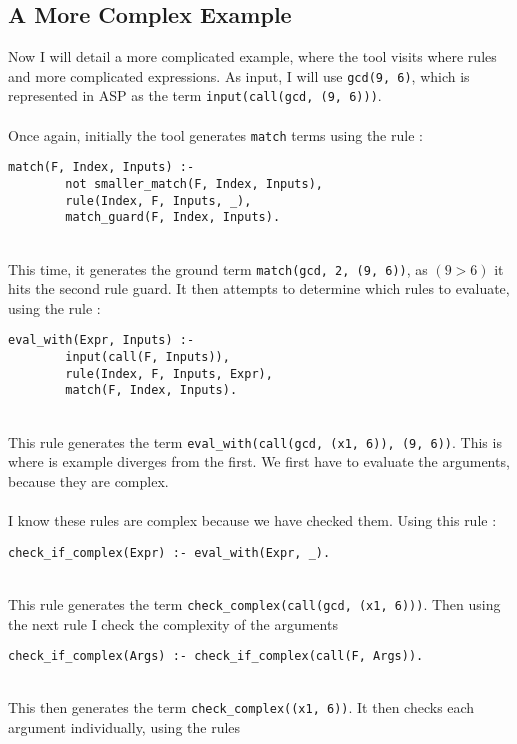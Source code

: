 \subsection{A More Complex Example}
Now I will detail a more complicated example, where the tool visits where rules and more complicated expressions. As input, I will use \lstinline{gcd(9, 6)}, which is represented in ASP as the term \lstinline{input(call(gcd, (9, 6)))}. \\ \\
Once again, initially the tool generates \lstinline{match} terms using the rule : \\ %

\begin{lstlisting}
match(F, Index, Inputs) :-
		not smaller_match(F, Index, Inputs), 
		rule(Index, F, Inputs, _), 
		match_guard(F, Index, Inputs).
\end{lstlisting}
\mbox{} \\
This time, it generates the ground term \lstinline{match(gcd, 2, (9, 6))}, as $(9 > 6)$ it hits the second rule guard. It then attempts to determine which rules to evaluate, using the rule : \\ %

\begin{lstlisting}
eval_with(Expr, Inputs) :- 
		input(call(F, Inputs)), 
		rule(Index, F, Inputs, Expr), 
		match(F, Index, Inputs).
\end{lstlisting}
\mbox{} \\
This rule generates the term \lstinline{eval_with(call(gcd, (x1, 6)), (9, 6))}. This is where is example diverges from the first. We first have to evaluate the arguments, because they are complex. \\ \\%
I know these rules are complex because we have checked them. Using this rule : \\

\begin{lstlisting}
check_if_complex(Expr) :- eval_with(Expr, _).
\end{lstlisting}
\mbox{} \\
This rule generates the term \lstinline{check_complex(call(gcd, (x1, 6)))}. Then using the next rule I check the complexity of the arguments \\ %

\begin{lstlisting}
check_if_complex(Args) :- check_if_complex(call(F, Args)).
\end{lstlisting}
\mbox{} \\
This then generates the term \lstinline{check_complex((x1, 6))}. It then checks each argument individually, using the rules  \\ %

